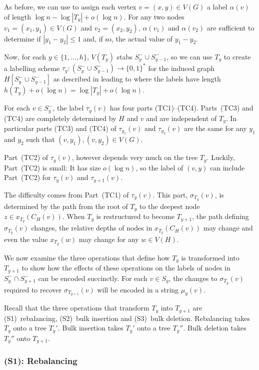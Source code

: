 \documentclass[kpfonts]{patmorin}
\begin{document}
As before, we can use  to assign each vertex $v=(x,y)\in V(G)$ a label $\alpha(v)$ of length $\log n - \log|T_y| + o(\log n)$. For any two nodes $v_1=(x_1,y_1)\in V(G)$ and $v_2=(x_2,y_2)$, $\alpha(v_1)$ and $\alpha(v_2)$ are sufficient to determine if $|y_1-y_2|\le 1$ and, if so, the actual value of $y_1-y_2$.

Now, for each $y\in\{1,\ldots,h\}$, $V(T_y)$ stabs $S^-_y\cup S^-_{y-1}$, so we can use $T_y$ to create a labelling scheme $\tau_y:(S^-_y\cup S^-_{y-1})\to\{0,1\}^*$ for the induced graph $H[S^-_y\cup S^-_{y-1}]$ as described in  leading to  where the labels have length $h(T_y) + o(\log n)=\log|T_y|+o(\log n)$.  

For each $v\in S^-_y$, the label $\tau_y(v)$ has four parts (TC1)--(TC4).  Parts~(TC3) and (TC4) are completely determined by $H$ and $v$ and are independent of $T_y$.  In particular parts (TC3) and (TC4) of $\tau_{y_1}(v)$ and $\tau_{y_2}(v)$ are the same for any $y_1$ and $y_2$ such that $(v,y_1),(v,y_2)\in V(G)$.  

Part~(TC2) of $\tau_y(v)$, however depends very much on the tree $T_y$.  Luckily, Part~(TC2) is small: It has size $o(\log n)$, so the label of $(v,y)$ can include Part~(TC2) for $\tau_{y}(v)$ and $\tau_{y+1}(v)$.

The difficulty comes from Part~(TC1) of $\tau_y(v)$.  This part, $\sigma_{T_y}(v)$, is determined by the path from the root of $T_y$ to the deepest node $z\in x_{T_y}(C_H(v))$.  When $T_y$ is restructured to become $T_{y+1}$, the path defining $\sigma_{T_y}(v)$ changes, the relative depths of nodes in $x_{T_y}(C_H(v))$ may change and even the value $x_{T_y}(w)$ may change for any $w\in V(H)$.  

We now examine the three operations that define how $T_y$ is transformed into $T_{y+1}$ to show how the effects of these operations on the labels of nodes in $S^-_y\cap S^-_{y+1}$ can be encoded succinctly.  For each $v\in S_y$, the changes to $\sigma_{T_y}(v)$ required to recover $\sigma_{T_{y+1}}(v)$ will be encoded in a string $\mu_y(v)$.

Recall that the three operations that transform $T_y$ into $T_{y+1}$ are (S1)~rebalancing, (S2)~bulk insertion and (S3)~bulk deletion. Rebalancing takes $T_y$ onto a tree $T_y'$. Bulk insertion takes $T_y'$ onto a tree $T_y''$.  Bulk deletion takes $T_y''$ onto $T_{y+1}$.


\subsubsection{(S1): Rebalancing}
\end{document}

